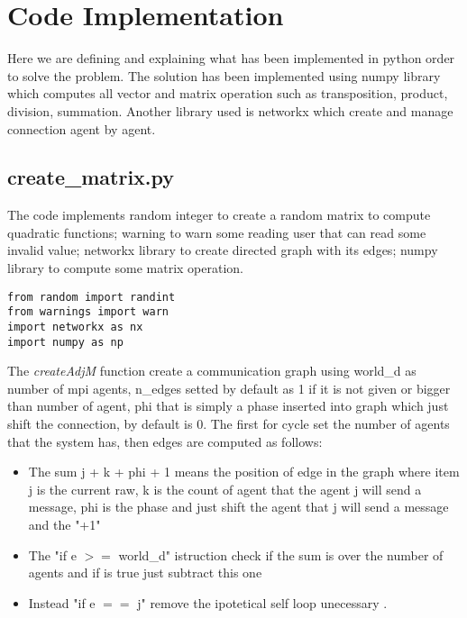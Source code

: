 \documentclass[a4paper,11pt,oneside]{book}
\begin{document}
\section {Code Implementation} \label{Sec1.2}

Here we are defining and explaining what has been implemented in python order to solve the problem. The solution has been implemented using 
numpy library which computes all vector and matrix operation such as transposition, product, division, summation. Another library used is
networkx which create and manage connection agent by agent.\\

\subsection {create\_matrix.py}

The code implements random integer to create a random matrix to
compute quadratic functions; warning to warn some reading user that
can read some invalid value; networkx library to create directed graph
with its edges; numpy library to compute some matrix operation.
\begin{lstlisting}
from random import randint
from warnings import warn
import networkx as nx
import numpy as np
\end{lstlisting}


The \textit{createAdjM} function create a communication graph using world\_d as number of
mpi agents, n\_edges  setted by default as 1 if it is not given or
bigger than number of agent, phi that is simply a phase inserted into
graph which just shift the connection, by default is 0. The first for
cycle set the number of agents that the system has, then edges are
computed as follows:
\begin{itemize}
    \item The sum j + k + phi + 1 means the position of edge in the
    graph where item j is the current raw, k is the count of agent 
    that the agent j will send a message, phi is the phase and just
    shift the agent that j will send a message and the "+1" 

    \item The "if e $>=$ world\_d" istruction check if the sum is over the number of
    agents and if is true just subtract this one

    \item Instead "if e $==$ j" remove the ipotetical self loop unecessary .
\end{itemize}
\end{document}
